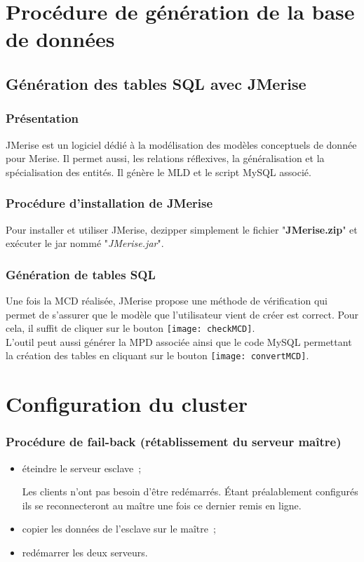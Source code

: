  \section{Procédure de génération de la base de données}
 
 \subsection{Génération des tables SQL avec JMerise}
 
 \subsubsection{Présentation}
JMerise est un logiciel dédié à la modélisation des modèles conceptuels de donnée pour Merise. Il permet aussi, les relations réflexives, la généralisation et la spécialisation des entités. Il génère le MLD et le script MySQL associé.

 \subsubsection{Procédure d'installation de JMerise}
Pour installer et utiliser JMerise, dezipper simplement le fichier "\textbf{JMerise.zip}" et exécuter le jar nommé "\textit{JMerise.jar}". 

 \subsubsection{Génération de tables SQL}
Une fois la MCD réalisée, JMerise propose une méthode de vérification qui permet de s'assurer que le modèle que l'utilisateur vient de créer est correct. Pour cela, il suffit de cliquer sur le bouton \texttt{[image: checkMCD]}.\\
L'outil peut aussi générer la MPD associée ainsi que le code MySQL permettant la création des tables en cliquant sur le bouton \texttt{[image: convertMCD]}.

\section{Configuration du cluster}

\subsubsection{Procédure de fail-back (rétablissement du serveur maître)}
\begin{itemize}
	\item éteindre le serveur esclave~;
	\begin{notation}
		Les clients n'ont pas besoin d'être redémarrés.
		Étant préalablement configurés ils se reconnecteront au maître une fois ce dernier remis en ligne.
	\end{notation}
	\item copier les données de l'esclave sur le maître~;
	\item redémarrer les deux serveurs.
\end{itemize}
